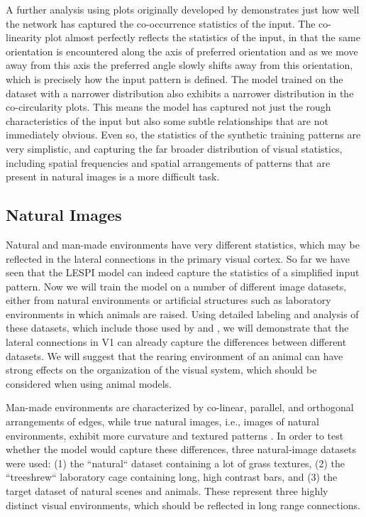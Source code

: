 A further analysis using plots originally developed by
\cite{Geisler2001} demonstrates just how well the network has captured
the co-occurrence statistics of the input. The co-linearity plot
almost perfectly reflects the statistics of the input, in that the
same orientation is encountered along the axis of preferred
orientation and as we move away from this axis the preferred angle
slowly shifts away from this orientation, which is precisely how the
input pattern is defined. The model trained on the dataset with a
narrower distribution also exhibits a narrower distribution in the
co-circularity plots. This means the model has captured not just the
rough characteristics of the input but also some subtle relationships
that are not immediately obvious. Even so, the statistics of the
synthetic training patterns are very simplistic, and capturing the far
broader distribution of visual statistics, including spatial
frequencies and spatial arrangements of patterns that are present in
natural images is a more difficult task.

\subsection{Natural Images}

Natural and man-made environments have very different statistics,
which may be reflected in the lateral connections in the primary
visual cortex. So far we have seen that the LESPI model can indeed
capture the statistics of a simplified input pattern. Now we will
train the model on a number of different image datasets, either from
natural environments or artificial structures such as laboratory
environments in which animals are raised. Using detailed labeling and
analysis of these datasets, which include those used by
\cite{Perrinet2015} and \cite{Serre2007}, we will demonstrate that the
lateral connections in V1 can already capture the differences between
different datasets.  We will suggest that the rearing environment of
an animal can have strong effects on the organization of the visual
system, which should be considered when using animal models.

Man-made environments are characterized by co-linear, parallel, and
orthogonal arrangements of edges, while true natural images, i.e.,
images of natural environments, exhibit more curvature and textured
patterns \citep{Perrinet2015}. In order to test whether the model
would capture these differences, three natural-image datasets were
used: (1) the ``natural`` dataset containing a lot of grass textures,
(2) the ``treeshrew`` laboratory cage containing long, high contrast
bars, and (3) the \cite{Serre2007} target dataset of natural scenes
and animals. These represent three highly distinct visual
environments, which should be reflected in long range connections.

